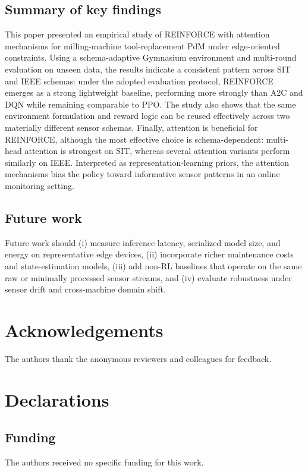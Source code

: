 \documentclass[sn-basic]{sn-jnl} %
\begin{document}
\subsection{Summary of key findings}
This paper presented an empirical study of \textsc{REINFORCE} with attention mechanisms for milling-machine tool-replacement PdM under edge-oriented constraints. Using a schema-adaptive Gymnasium environment and multi-round evaluation on unseen data, the results indicate a consistent pattern across SIT and IEEE schemas: under the adopted evaluation protocol, \textsc{REINFORCE} emerges as a strong lightweight baseline, performing more strongly than \textsc{A2C} and \textsc{DQN} while remaining comparable to \textsc{PPO}. The study also shows that the same environment formulation and reward logic can be reused effectively across two materially different sensor schemas. Finally, attention is beneficial for \textsc{REINFORCE}, although the most effective choice is schema-dependent: multi-head attention is strongest on SIT, whereas several attention variants perform similarly on IEEE. Interpreted as representation-learning priors, the attention mechanisms bias the policy toward informative sensor patterns in an online monitoring setting.

\subsection{Future work}
Future work should (i) measure inference latency, serialized model size, and energy on representative edge devices, (ii) incorporate richer maintenance costs and state-estimation models, (iii) add non-RL baselines that operate on the same raw or minimally processed sensor streams, and (iv) evaluate robustness under sensor drift and cross-machine domain shift.



\section*{Acknowledgements}
The authors thank the anonymous reviewers and colleagues for feedback.

\section*{Declarations}

\subsection*{Funding}
The authors received no specific funding for this work.
\end{document}
